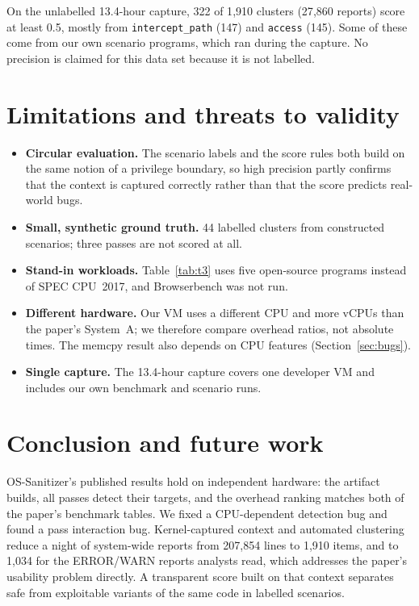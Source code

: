\documentclass[11pt,a4paper]{article}
\newcommand{\pass}[1]{\texttt{#1}}
\begin{document}
On the unlabelled 13.4-hour capture, 322 of 1{,}910 clusters (27{,}860 reports) score at least 0.5,
mostly from \pass{intercept\_path} (147) and \pass{access} (145). Some of these come from our own
scenario programs, which ran during the capture. No precision is claimed for this data set because
it is not labelled.

\section{Limitations and threats to validity}

\begin{itemize}
  \item \textbf{Circular evaluation.} The scenario labels and the score rules both build on the
  same notion of a privilege boundary, so high precision partly confirms that the context is
  captured correctly rather than that the score predicts real-world bugs.
  \item \textbf{Small, synthetic ground truth.} 44 labelled clusters from constructed scenarios;
  three passes are not scored at all.
  \item \textbf{Stand-in workloads.} Table~\ref{tab:t3} uses five open-source programs instead of
  SPEC CPU~2017, and Browserbench was not run.
  \item \textbf{Different hardware.} Our VM uses a different CPU and more vCPUs than the paper's
  System~A; we therefore compare overhead ratios, not absolute times. The memcpy result also
  depends on CPU features (Section~\ref{sec:bugs}).
  \item \textbf{Single capture.} The 13.4-hour capture covers one developer VM and includes our
  own benchmark and scenario runs.
\end{itemize}

\section{Conclusion and future work}

OS-Sanitizer's published results hold on independent hardware: the artifact builds, all passes
detect their targets, and the overhead ranking matches both of the paper's benchmark tables. We
fixed a CPU-dependent detection bug and found a pass interaction bug. Kernel-captured context and
automated clustering reduce a night of system-wide reports from 207{,}854 lines to 1{,}910 items,
and to 1{,}034 for the ERROR/WARN reports analysts read, which addresses the paper's usability
problem directly. A transparent score built on that context separates safe from exploitable
variants of the same code in labelled scenarios.
\end{document}
